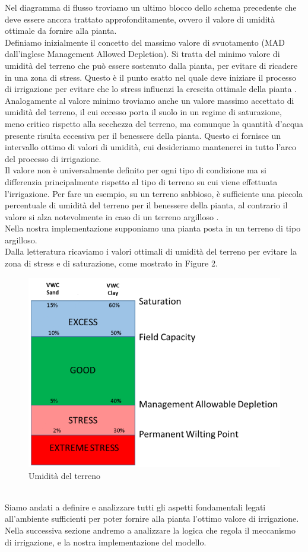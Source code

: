 \documentclass[conference,10pt]{IEEEtran}
\begin{document}
Nel diagramma di flusso troviamo un ultimo blocco dello schema precedente che deve essere ancora trattato approfonditamente, ovvero il valore di umidità ottimale da fornire alla pianta.\\
Definiamo inizialmente il concetto del massimo valore di svuotamento (MAD dall'inglese Management Allowed Depletion).
Si tratta del minimo valore di umidità del terreno che può essere sostenuto dalla pianta, per evitare di ricadere in una zona di stress.
Questo è il punto esatto nel quale deve iniziare il processo di irrigazione per evitare che lo stress influenzi la crescita ottimale della pianta \cite{5}.\\ 
Analogamente al valore minimo troviamo anche un valore massimo accettato di umidità del terreno, il cui eccesso porta il suolo in un regime di saturazione, meno critico rispetto alla secchezza del terreno, ma comunque la quantità d'acqua presente risulta eccessiva per il benessere della pianta. Questo ci fornisce un intervallo ottimo di valori di umidità, cui desideriamo mantenerci in tutto l'arco del processo di irrigazione.\\
Il valore non è universalmente definito per ogni tipo di condizione ma si differenzia principalmente rispetto al tipo di terreno su cui viene effettuata l'irrigazione. Per fare un esempio, su un terreno sabbioso, è sufficiente una piccola percentuale di umidità del terreno per il benessere della pianta, al contrario il valore si alza notevolmente in caso di un terreno argilloso \cite{5}. \\
Nella nostra implementazione supponiamo una pianta posta in un terreno di tipo argilloso.\\ Dalla letteratura ricaviamo i valori ottimali di umidità del terreno per evitare la zona di stress e di saturazione, come mostrato in Figure 2.\vspace*{0.1 cm}
\begin{figure}[ht]
	\centering
	\includegraphics[width=0.8\linewidth]{images/SoilMoistureTerms.png}
	\caption{Umidità del terreno}
	\label{fig:MAD}
\end{figure}
\\Siamo andati a definire e analizzare tutti gli aspetti fondamentali legati all'ambiente sufficienti per poter fornire alla pianta l'ottimo valore di irrigazione.\\
Nella successiva sezione andremo a analizzare la logica che regola il meccanismo di irrigazione, e la nostra implementazione del modello.
\end{document}
